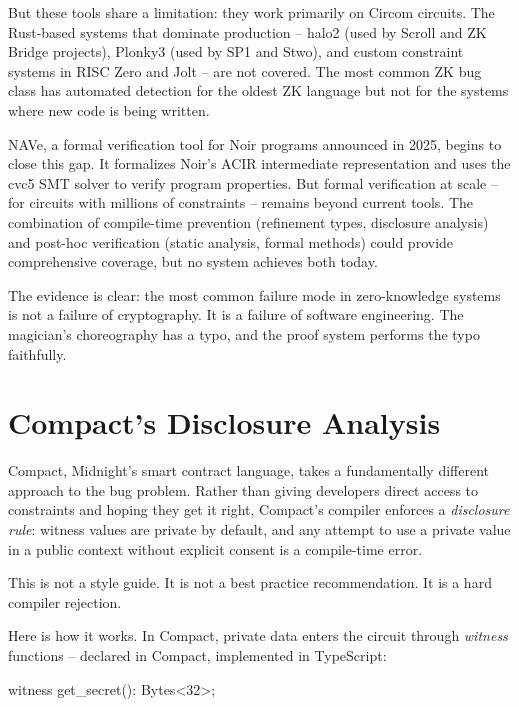 \documentclass[
  11pt,
  openany]{report}
\newenvironment{Shaded}{\begin{snugshade}}{\end{snugshade}}
\newcommand{\DecValTok}[1]{\textcolor[rgb]{0.91,0.66,0.43}{#1}}
\newcommand{\FunctionTok}[1]{\textcolor[rgb]{0.49,0.78,0.89}{#1}}
\newcommand{\NormalTok}[1]{\textcolor[rgb]{0.78,0.80,0.85}{#1}}
\newcommand{\OperatorTok}[1]{\textcolor[rgb]{0.78,0.80,0.85}{#1}}
\renewenvironment{Shaded}{%
  \begin{tcolorbox}[
    colback=MidnightCode,
    colframe=MidnightBorder,
    arc=4pt,
    boxrule=0.5pt,
    left=8pt, right=8pt, top=6pt, bottom=6pt,
    breakable, enhanced
  ]%
}{\end{tcolorbox}}
\begin{document}
But these tools share a limitation: they work primarily on Circom circuits. The
Rust-based systems that dominate production -- halo2 (used by Scroll and ZK
Bridge projects), Plonky3 (used by SP1 and Stwo), and custom constraint systems
in RISC Zero and Jolt -- are not covered. The most common ZK bug class has
automated detection for the oldest ZK language but not for the systems where new
code is being written.

NAVe, a formal verification tool for Noir programs announced in 2025, begins to
close this gap. It formalizes Noir's ACIR intermediate representation and uses
the cvc5 SMT solver to verify program properties. But formal verification at
scale -- for circuits with millions of constraints -- remains beyond current
tools. The combination of compile-time prevention (refinement types, disclosure
analysis) and post-hoc verification (static analysis, formal methods) could
provide comprehensive coverage, but no system achieves both today.

The evidence is clear: the most common failure mode in zero-knowledge systems is
not a failure of cryptography. It is a failure of software engineering. The
magician's choreography has a typo, and the proof system performs the typo
faithfully.

\section{Compact's Disclosure Analysis}\label{compacts-disclosure-analysis}

Compact, Midnight's smart contract language, takes a fundamentally different
approach to the bug problem. Rather than giving developers direct access to
constraints and hoping they get it right, Compact's compiler enforces a
\emph{disclosure rule}: witness values are private by default, and any attempt
to use a private value in a public context without explicit consent is a
compile-time error.

This is not a style guide. It is not a best practice recommendation. It is a
hard compiler rejection.

Here is how it works. In Compact, private data enters the circuit through
\emph{witness} functions -- declared in Compact, implemented in TypeScript:

\begin{Shaded}
\begin{Highlighting}[]
\NormalTok{witness }\FunctionTok{get\_secret}\NormalTok{()}\OperatorTok{:}\NormalTok{ Bytes}\OperatorTok{\textless{}}\DecValTok{32}\OperatorTok{\textgreater{};}
\end{Highlighting}
\end{Shaded}
\end{document}
